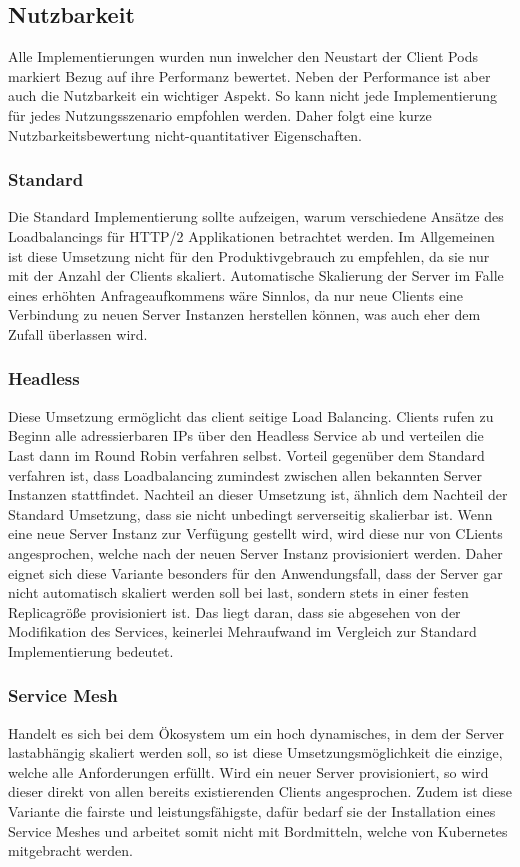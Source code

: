 \subsection{Nutzbarkeit}\label{subsec:nutzbarkeit}

Alle Implementierungen wurden nun inwelcher den Neustart der Client Pods markiert Bezug auf ihre Performanz bewertet.
Neben der Performance ist aber auch die Nutzbarkeit ein wichtiger Aspekt.
So kann nicht jede Implementierung für jedes Nutzungsszenario empfohlen werden.
Daher folgt eine kurze Nutzbarkeitsbewertung nicht-quantitativer Eigenschaften.

\subsubsection{Standard}
Die Standard Implementierung sollte aufzeigen, warum verschiedene Ansätze des Loadbalancings für HTTP/2 Applikationen betrachtet werden.
Im Allgemeinen ist diese Umsetzung nicht für den Produktivgebrauch zu empfehlen, da sie nur mit der Anzahl der Clients skaliert.
Automatische Skalierung der Server im Falle eines erhöhten Anfrageaufkommens wäre Sinnlos, da nur neue Clients eine Verbindung zu neuen Server Instanzen herstellen können, was auch eher dem Zufall überlassen wird.

\subsubsection{Headless}
Diese Umsetzung ermöglicht das client seitige Load Balancing.
Clients rufen zu Beginn alle adressierbaren IPs über den Headless Service ab und verteilen die Last dann im Round Robin verfahren selbst.
Vorteil gegenüber dem Standard verfahren ist, dass Loadbalancing zumindest zwischen allen bekannten Server Instanzen stattfindet.
Nachteil an dieser Umsetzung ist, ähnlich dem Nachteil der Standard Umsetzung, dass sie nicht unbedingt serverseitig skalierbar ist.
Wenn eine neue Server Instanz zur Verfügung gestellt wird, wird diese nur von CLients angesprochen, welche nach der neuen Server Instanz provisioniert werden.
Daher eignet sich diese Variante besonders für den Anwendungsfall, dass der Server gar nicht automatisch skaliert werden soll bei last, sondern stets in einer festen Replicagröße provisioniert ist.
Das liegt daran, dass sie abgesehen von der Modifikation des Services, keinerlei Mehraufwand im Vergleich zur Standard Implementierung bedeutet.

\subsubsection{Service Mesh}
Handelt es sich bei dem Ökosystem um ein hoch dynamisches, in dem der Server lastabhängig skaliert werden soll, so ist diese Umsetzungsmöglichkeit die einzige, welche alle Anforderungen erfüllt.
Wird ein neuer Server provisioniert, so wird dieser direkt von allen bereits existierenden Clients angesprochen.
Zudem ist diese Variante die fairste und leistungsfähigste, dafür bedarf sie der Installation eines Service Meshes und arbeitet somit nicht mit Bordmitteln, welche von Kubernetes mitgebracht werden.
